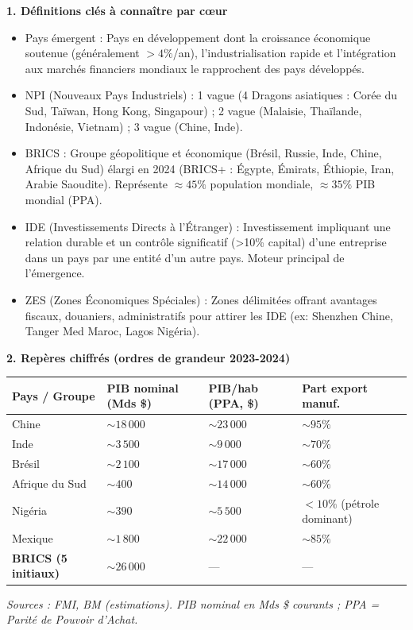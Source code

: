 \documentclass[11pt]{article}
\newcommand{\cle}[1]{{\popxbold\color{popdark}#1}}
\newcounter{popsec}
\newcounter{popsub}
\newcommand{\courssub}[1]{%
  \stepcounter{popsub}%
  \par\vspace{9pt}\noindent{\popxbold\fontsize{11.5}{13}\selectfont\color{popink}{\color{poporange}\thepopsec.\thepopsub}\hspace{6pt}#1}\par\nopagebreak\vspace{4pt}
}
\begin{document}
\courssub{Bilan structuré}
\begin{bilan}

\textbf{1. Définitions clés à connaître par cœur}
\begin{itemize}
    \item \cle{Pays émergent} : Pays en développement dont la croissance économique soutenue (généralement $> 4\%$/an), l'industrialisation rapide et l'intégration aux marchés financiers mondiaux le rapprochent des pays développés.
    \item \cle{NPI (Nouveaux Pays Industriels)} : 1 vague (4 Dragons asiatiques : Corée du Sud, Taïwan, Hong Kong, Singapour) ; 2 vague (Malaisie, Thaïlande, Indonésie, Vietnam) ; 3 vague (Chine, Inde).
    \item \cle{BRICS} : Groupe géopolitique et économique (Brésil, Russie, Inde, Chine, Afrique du Sud) élargi en 2024 (BRICS+ : Égypte, Émirats, Éthiopie, Iran, Arabie Saoudite). Représente $\approx 45\%$ population mondiale, $\approx 35\%$ PIB mondial (PPA).
    \item \cle{IDE (Investissements Directs à l'Étranger)} : Investissement impliquant une relation durable et un contrôle significatif (\textgreater 10\% capital) d'une entreprise dans un pays par une entité d'un autre pays. Moteur principal de l'émergence.
    \item \cle{ZES (Zones Économiques Spéciales)} : Zones délimitées offrant avantages fiscaux, douaniers, administratifs pour attirer les IDE (ex: Shenzhen Chine, Tanger Med Maroc, Lagos Nigéria).
\end{itemize}

\textbf{2. Repères chiffrés (ordres de grandeur 2023-2024)}
\begin{center}
\begin{tabularx}{\linewidth}{|l|X|X|X|}\hline
\rowcolor{popblueL}
\textbf{Pays / Groupe} & \textbf{PIB nominal (Mds \$)} & \textbf{PIB/hab (PPA, \$)} & \textbf{Part export manuf.} \\ \hline
Chine & $\sim 18\,000$ & $\sim 23\,000$ & $\sim 95\%$ \\ \hline
Inde & $\sim 3\,500$ & $\sim 9\,000$ & $\sim 70\%$ \\ \hline
Brésil & $\sim 2\,100$ & $\sim 17\,000$ & $\sim 60\%$ \\ \hline
Afrique du Sud & $\sim 400$ & $\sim 14\,000$ & $\sim 60\%$ \\ \hline
Nigéria & $\sim 390$ & $\sim 5\,500$ & $< 10\%$ (pétrole dominant) \\ \hline
Mexique & $\sim 1\,800$ & $\sim 22\,000$ & $\sim 85\%$ \\ \hline
\textbf{BRICS (5 initiaux)} & $\sim 26\,000$ & --- & --- \\ \hline
\end{tabularx}
\end{center}
\textit{Sources : FMI, BM (estimations). PIB nominal en Mds \$ courants ; PPA = Parité de Pouvoir d'Achat.}


\end{bilan}
\end{document}
